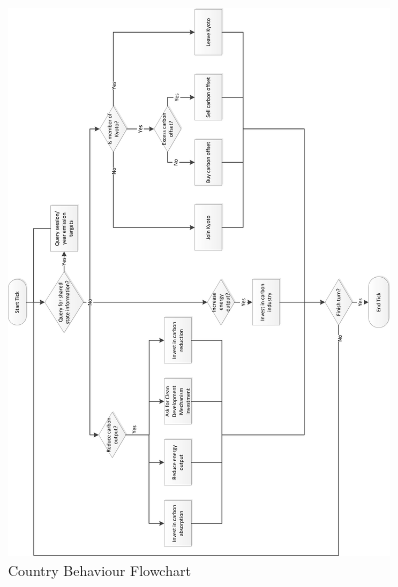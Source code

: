 \begin{figure}[h!]
	\centering
	\includegraphics[width=0.9\textwidth]{img/country_behaviour_flowchart.png}
	\caption{Country Behaviour Flowchart}
	\label{fig:country_behaviour_flowchart}
\end{figure}
